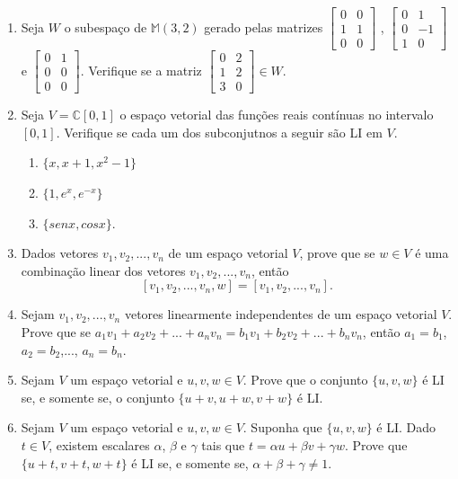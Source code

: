 \begin{enumerate}
\item  Seja $W$ o subespaço de $\mathbb{M}(3,2)$  gerado pelas matrizes $\begin{bmatrix}0 & 0 \\ 1& 1 \\0 & 0 \end{bmatrix}$ , $ \begin{bmatrix}0 & 1 \\ 0& -1 \\1& 0 \end{bmatrix}$ e  $\begin{bmatrix}0 & 1\\ 0& 0\\ 0 & 0 \end{bmatrix}$. Verifique se a matriz $\begin{bmatrix}0 & 2\\ 1& 2\\ 3& 0 \end{bmatrix} \in W$.


\item Seja $V=\mathbb{C}[0,1]$ o espaço vetorial das funções reais contínuas no intervalo $[0,1]$. Verifique se cada um dos  subconjutnos a seguir são LI em $V$.

\begin{enumerate}[label=(\alph*)]
\item $\{ x, x+1, x^2-1\} $
\item $\{1, e^x, e^{-x}\}$
\item $\{ senx, cosx\}$.
\end{enumerate}

\item Dados vetores $v_1, v_2,..., v_n$  de um espaço vetorial $V$,  prove que se $w\in V$  é uma combinação linear dos vetores  $v_1, v_2,..., v_n$, então $$[v_1, v_2,..., v_n, w]=[v_1, v_2,..., v_n].$$

\item Sejam $v_1, v_2,..., v_n$ vetores linearmente independentes de um espaço vetorial $V$. Prove que  se $a_1v_1+a_2v_2+...+a_n v_n=b_1v_1+b_2v_2+...+b_n v_n$, então  $a_1=b_1$, $a_2=b_2$,..., $a_n=b_n$.
\item Sejam $V$ um espaço vetorial  e $ u, v, w \in V$. Prove que o conjunto $\{ u, v, w\}$ é LI se, e somente se, o conjunto $\{ u+v, u+w, v+w\} $ é LI.

\item Sejam $V$ um espaço vetorial  e $ u, v, w \in V$. Suponha que $\{ u, v, w\}$ é LI. Dado $t \in V$, existem escalares $\alpha$, $\beta$ e $\gamma$ tais que  $t=\alpha u+\beta v+\gamma w$. Prove que $\{u+t, v+t, w+t\}$ é LI se, e somente se, $\alpha+\beta+\gamma \neq 1$.

\end{enumerate}

